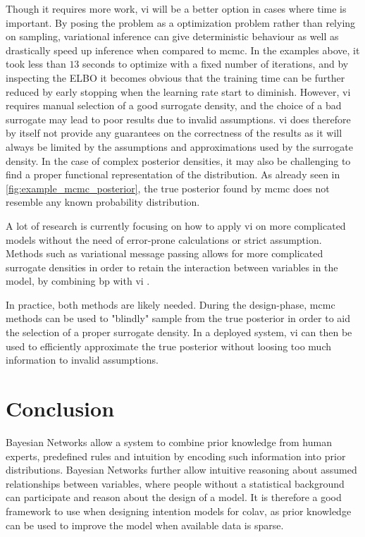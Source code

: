 Though it requires more work, \acrshort{vi} will be a better option in cases where time is important. By posing the problem as a optimization problem rather than relying on sampling, variational inference can give deterministic behaviour as well as drastically speed up inference when compared to \acrshort{mcmc}. In the examples above, it took less than $13$ seconds to optimize with a fixed number of iterations, and by inspecting the ELBO it becomes obvious that the training time can be further reduced by early stopping when the learning rate start to diminish. 
However, \acrshort{vi} requires manual selection of a good surrogate density, and the choice of a bad surrogate may lead to poor results due to invalid assumptions. \acrshort{vi} does therefore by itself not provide any guarantees on the correctness of the results as it will always be limited by the assumptions and approximations used by the surrogate density. In the case of complex posterior densities, it may also be challenging to find a proper functional representation of the distribution. As already seen in \cref{fig:example_mcmc_posterior}, the true posterior found by \acrshort{mcmc} does not resemble any known probability distribution. 

A lot of research is currently focusing on how to apply \acrshort{vi} on more complicated models without the need of error-prone calculations or strict assumption. Methods such as variational message passing allows for more complicated surrogate densities in order to retain the interaction between variables in the model, by combining \acrshort{bp} with \acrshort{vi} \cite{winnbishop}. 

In practice, both methods are likely needed. During the design-phase, \acrshort{mcmc} methods can be used to "blindly" sample from the true posterior in order to aid the selection of a proper surrogate density. In a deployed system, \acrshort{vi} can then be used to efficiently approximate the true posterior without loosing too much information to invalid assumptions.

\section{Conclusion}
Bayesian Networks allow a system to combine prior knowledge from human experts, predefined rules and intuition by encoding such information into prior distributions. Bayesian Networks further allow intuitive reasoning about assumed relationships between variables, where people without a statistical background can participate and reason about the design of a model. It is therefore a good framework to use when designing intention models for \acrshort{colav}, as prior knowledge can be used to improve the model when available data is sparse.

